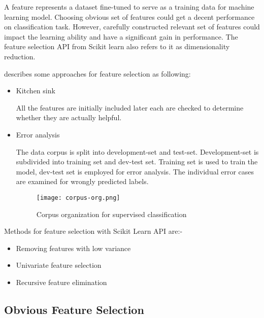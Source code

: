 A feature represents a dataset fine-tuned to serve as a training data for machine learning model. Choosing obvious set of features could get a decent performance on classification task. However, carefully constructed relevant set of features could impact the learning ability and have a significant gain in performance. The feature selection API from Scikit learn \parencite{sklearn_api} also refers to it as dimensionality reduction. 

\parencite{BirdKleinLoper09}  describes some approaches for feature selection as following:

\begin{itemize}
      \item Kitchen sink 
      

      All the features are initially included later each are checked to determine whether they are actually helpful.

      \item Error analysis
      
      The data corpus is split into development-set and test-set. Development-set is subdivided into training set and dev-test set. Training set is used to train the model, dev-test set is employed for error analysis.  The individual error cases are examined for wrongly predicted labels.
      
      
      \begin{figure}[H]
            \centering    
            \texttt{[image: corpus-org.png]}
            \caption{Corpus organization for supervised classification \parencite{BirdKleinLoper09}}
            \label{fig:corpus-supervised-classification}
        \end{figure}

\end{itemize}

 Methods for feature selection with Scikit Learn API are:-
\begin{itemize}
      \item Removing features with low variance
      \item Univariate feature selection
      \item Recursive feature elimination

\end{itemize}
\clearpage
\subsection{Obvious Feature Selection}

